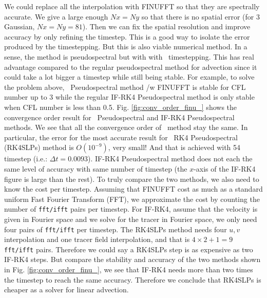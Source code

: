 \documentclass[11pt,letterpaper]{article}
\begin{document}
We could replace all the interpolation with FINUFFT so that they are spectrally accurate. We give a large enough $Nx = Ny$ so that there is no spatial error (for 3 Gaussian, $Nx = Ny = 81$). Then we can fix the spatial resolution and improve accuracy by only refining the timestep. This is a good way to isolate the error produced by the timestepping. But this is also viable numerical method. In a sense, the method is pseudospectral but with with \sml\ timestepping. This has real advantage compared to the regular pseudospectral method for advection since it could take a lot bigger a timestep while still being stable. 
For example, to solve the problem above, \sml\ Pseudospectral method /w FINUFFT is stable for CFL number up to 3 while the regular IF-RK4 Pseudospectral method is only stable when CFL number is less than 0.5. Fig. \ref{fig:conv_order_finu_} shows the convergence order result for \sml\ Pseudospectral and IF-RK4 Pseudospectral methods. We see that all the convergence order of \sml\ method stay the same. In particular, the error for the most accurate result for \sml\ RK4 Pseudospectral (RK4SLPs) method is $O(10^{-9})$, very small! And that is achieved with 54 timestep (i.e.: $\Delta t = 0.0093$). IF-RK4 Pseudospectral method does not each the same level of accuracy with same number of timestep (the $x$-axis of the IF-RK4 figure is large than the rest). To truly compare the two methods, we also need to know the cost per timestep. Assuming that FINUFFT cost as much as a standard uniform Fast Fourier Transform (FFT), we approximate the cost by counting the number of \texttt{fft/ifft} pairs per timestep. For IF-RK4, assume that the velocity is given in Fourier space and we solve for the tracer in Fourier space, we only need four pairs of \texttt{fft/ifft} per timestep. The RK4SLPs method needs four $u,v$ interpolation and one tracer field interpolation, and that is $4\times 2+1 = 9$ \texttt{fft/ifft} pairs. Therefore we could say a RK4SLPs step is as expensive as two IF-RK4 steps. But compare the stability and accuracy of the two methods shown in Fig. \ref{fig:conv_order_finu_}, we see that IF-RK4 needs more than two times the timestep to reach the same accuracy. Therefore we conclude that RK4SLPs is cheaper as a solver for linear advection.
\end{document}

